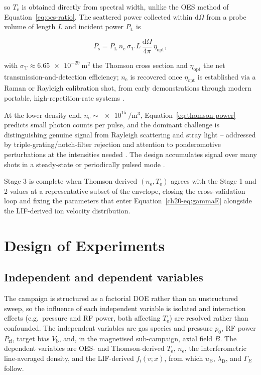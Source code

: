 so $T_{\mathrm{e}}$ is obtained directly from spectral width, unlike the OES method of Equation~\eqref{eq:oes-ratio}. The scattered power collected within $\mathrm{d}\Omega$ from a probe volume of length $L$ and incident power $P_{\mathrm{L}}$ is

\begin{equation}
P_{\mathrm{s}} = P_{\mathrm{L}} \, n_{\mathrm{e}} \, \sigma_{\mathrm{T}} \, L \, \frac{\mathrm{d}\Omega}{4\pi} \, \eta_{\mathrm{opt}},
\label{eq:thomson-power}
\end{equation}

with $\sigma_{\mathrm{T}} \approx \SI{6.65e-29}{\meter\squared}$ the Thomson cross section and $\eta_{\mathrm{opt}}$ the net transmission-and-detection efficiency; $n_{\mathrm{e}}$ is recovered once $\eta_{\mathrm{opt}}$ is established via a Raman or Rayleigh calibration shot, from early demonstrations through modern portable, high-repetition-rate systems \cite{ref0355,ref0357,ref0383,ref0384}.

At the lower density end, $n_{\mathrm{e}} \sim \SI{e15}{\per\cubic\meter}$, Equation~\eqref{eq:thomson-power} predicts small photon counts per pulse, and the dominant challenge is distinguishing genuine signal from Rayleigh scattering and stray light -- addressed by triple-grating/notch-filter rejection and attention to ponderomotive perturbations at the intensities needed \cite{ref0360,ref0362}. The design accumulates signal over many shots in a steady-state or periodically pulsed mode \cite{ref0357}.

Stage 3 is complete when Thomson-derived $(n_{\mathrm{e}}, T_{\mathrm{e}})$ agrees with the Stage 1 and 2 values at a representative subset of the envelope, closing the cross-validation loop and fixing the parameters that enter Equation~\eqref{ch20-eq:gammaE} alongside the LIF-derived ion velocity distribution.

\section{Design of Experiments}

\subsection{Independent and dependent variables}

The campaign is structured as a factorial DOE rather than an unstructured sweep, so the influence of each independent variable is isolated and interaction effects (e.g.\ pressure and RF power, both affecting $T_{\mathrm{e}}$) are resolved rather than confounded. The independent variables are gas species and pressure $p_{0}$, RF power $P_{\mathrm{rf}}$, target bias $V_{\mathrm{b}}$, and, in the magnetised sub-campaign, axial field $B$. The dependent variables are OES- and Thomson-derived $T_{\mathrm{e}}$, $n_{\mathrm{e}}$, the interferometric line-averaged density, and the LIF-derived $f_{\mathrm{i}}(v;x)$, from which $u_{\mathrm{B}}$, $\lambda_{\mathrm{D}}$, and $\Gamma_{E}$ follow.

